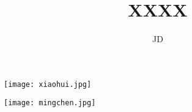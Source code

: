 
\title{XXXX} %
\author{JD} %


\begin{flushleft}
\hspace{8.5mm}\texttt{[image: xiaohui.jpg]} %
\end{flushleft}
\begin{center} %
\texttt{[image: mingchen.jpg]} %
\end{center}
\vspace{6.5mm}
\begin{center}
{\heiti \bfseries {}}
\end{center}
\vspace{20mm}
\begin{center}
{\heiti \erhao \textbf{\@title}}
\end{center}
\vspace{28mm}
\begin{center}
\makeatletter
{\sanhao {}}\\\vspace{2.4mm}
{\sanhao {}}\\\vspace{2.4mm}
{\sanhao {}}\\\vspace{2.4mm}
{\sanhao {}}\\\vspace{2.4mm}
{\sanhao {}}\\\vspace{2.4mm}
{\sanhao {}}\\\vspace{2.4mm}
{\sanhao {}}
\makeatother
\end{center}
\vfill
\begin{center}
\makeatletter
\sanhao \heiti {\CJK@today}
\makeatother
\end{center}

